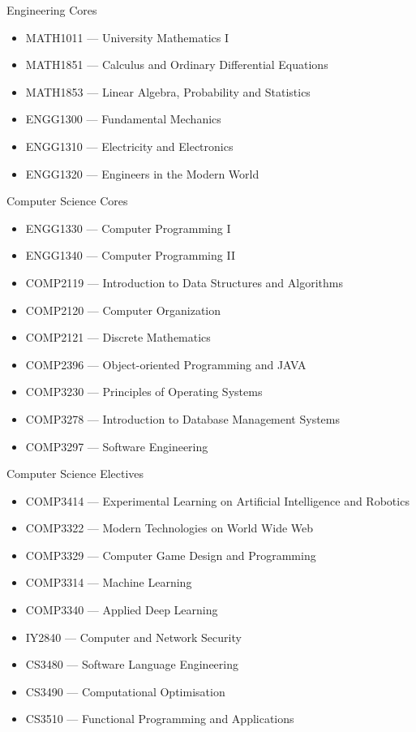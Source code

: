 Engineering Cores
\begin{itemize}
    \item[] MATH1011 --- University Mathematics I
    \item[] MATH1851 --- Calculus and Ordinary Differential Equations
    \item[] MATH1853 --- Linear Algebra, Probability and Statistics
    \item[] ENGG1300 --- Fundamental Mechanics
    \item[] ENGG1310 --- Electricity and Electronics
    \item[] ENGG1320 --- Engineers in the Modern World
\end{itemize}

Computer Science Cores
\begin{itemize}
    \item[] ENGG1330 --- Computer Programming I
    \item[] ENGG1340 --- Computer Programming II
    \item[] COMP2119 --- Introduction to Data Structures and Algorithms
    \item[] COMP2120 --- Computer Organization
    \item[] COMP2121 --- Discrete Mathematics
    \item[] COMP2396 --- Object-oriented Programming and JAVA
    \item[] COMP3230 --- Principles of Operating Systems
    \item[] COMP3278 --- Introduction to Database Management Systems
    \item[] COMP3297 --- Software Engineering
\end{itemize}

Computer Science Electives
\begin{itemize}
    \item[] COMP3414 --- Experimental Learning on Artificial Intelligence and Robotics
    \item[] COMP3322 --- Modern Technologies on World Wide Web
    \item[] COMP3329 --- Computer Game Design and Programming
    \item[] COMP3314 --- Machine Learning
    \item[] COMP3340 --- Applied Deep Learning

    \item[] IY2840 --- Computer and Network Security
    \item[] CS3480 --- Software Language Engineering
    \item[] CS3490 --- Computational Optimisation
    \item[] CS3510 --- Functional Programming and Applications
\end{itemize}

